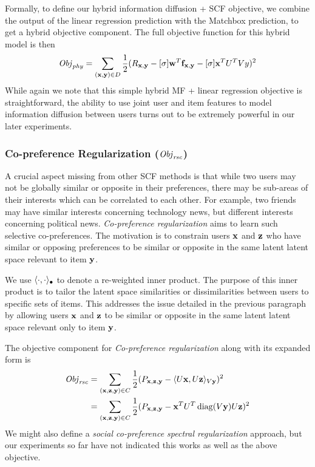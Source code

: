 Formally, to define our hybrid information diffusion + SCF objective,
we combine the output of the linear regression prediction with the
Matchbox prediction, to get a hybrid objective component. The full
objective function for this hybrid model is then
\begin{align}
\mathit{Obj}_{\mathit{phy}} = \sum_{(\mathbf{x},\mathbf{y}) \in D} \frac{1}{2} (R_{\mathbf{x},\mathbf{y}} - [\sigma] \mathbf{w}^T \mathbf{f}_{\mathbf{x},\mathbf{y}} - [\sigma] \mathbf{x}^T U^T V y)^2
\end{align}
While again we note that this simple hybrid MF + linear regression
objective is straightforward, the ability to use joint user and item
features to model information diffusion between users turns out to be 
extremely powerful in our later experiments.

\subsubsection{Co-preference Regularization ($\mathit{Obj}_{\mathit{rsc}}$)}
\label{sec:rsc}

A crucial aspect missing from other SCF methods is that while two
users may not be globally similar or opposite in their preferences,
there may be sub-areas of their interests which can be correlated to
each other.  For example, two friends may have similar interests
concerning technology news, but different interests concerning
political news.  \emph{Co-preference regularization} aims to learn
such selective co-preferences.  The motivation is to constrain users
$\mathbf{x}$ and $\mathbf{z}$ who have similar or opposing preferences to be similar
or opposite in the same latent latent space relevant to item $\mathbf{y}$.

We use $\langle \cdot, \cdot \rangle_{\bullet}$ to denote a re-weighted inner
product. The purpose of this inner product is to tailor the latent
space similarities or dissimilarities between users to specific sets
of items.  This addresses the issue detailed in the previous paragraph by
allowing users $\mathbf{x}$ and $\mathbf{z}$ to be similar or opposite in the same
latent latent space relevant only to item $\mathbf{y}$.

The objective component for \emph{Co-preference regularization} along
with its expanded form is
\begin{align}
\mathit{Obj}_{\mathit{rsc}} & = \sum_{(\mathbf{x},\mathbf{z},\mathbf{y}) \in C} \frac{1}{2} (P_{\mathbf{x},\mathbf{z},\mathbf{y}} - \langle U\mathbf{x}, U\mathbf{z} \rangle_{V\mathbf{y}})^2 \\
& = \sum_{(\mathbf{x},\mathbf{z},\mathbf{y}) \in C} \frac{1}{2} (P_{\mathbf{x},\mathbf{z},\mathbf{y}} - \mathbf{x}^T U^T \operatorname{diag}(V\mathbf{y}) U \mathbf{z})^2 \nonumber
\end{align}
We might also define a \emph{social co-preference spectral
regularization} approach, but our experiments so far have not indicated
this works as well as the above objective.  

